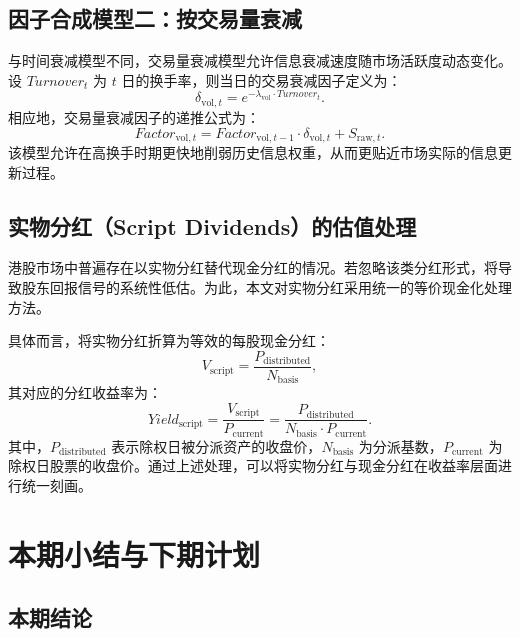 \documentclass[a4paper,10pt]{article}
\begin{document}
\subsection{因子合成模型二：按交易量衰减}

与时间衰减模型不同，交易量衰减模型允许信息衰减速度随市场活跃度动态变化。设 $Turnover_t$ 为 $t$ 日的换手率，则当日的交易衰减因子定义为：
\begin{equation}
\delta_{\text{vol},t} = e^{-\lambda_{\text{vol}} \cdot Turnover_t}.
\end{equation}
相应地，交易量衰减因子的递推公式为：
\begin{equation}
Factor_{\text{vol},t}
=
Factor_{\text{vol},t-1} \cdot \delta_{\text{vol},t}
+
S_{\text{raw},t}.
\end{equation}
该模型允许在高换手时期更快地削弱历史信息权重，从而更贴近市场实际的信息更新过程。

\subsection{实物分红（Script Dividends）的估值处理}

港股市场中普遍存在以实物分红替代现金分红的情况。若忽略该类分红形式，将导致股东回报信号的系统性低估。为此，本文对实物分红采用统一的等价现金化处理方法。

具体而言，将实物分红折算为等效的每股现金分红：
\begin{equation}
V_{\text{script}} = \frac{P_{\text{distributed}}}{N_{\text{basis}}},
\end{equation}
其对应的分红收益率为：
\begin{equation}
Yield_{\text{script}}
=
\frac{V_{\text{script}}}{P_{\text{current}}}
=
\frac{P_{\text{distributed}}}{N_{\text{basis}} \cdot P_{\text{current}}}.
\end{equation}
其中，$P_{\text{distributed}}$ 表示除权日被分派资产的收盘价，$N_{\text{basis}}$ 为分派基数，$P_{\text{current}}$ 为除权日股票的收盘价。通过上述处理，可以将实物分红与现金分红在收益率层面进行统一刻画。




\section{本期小结与下期计划}

\subsection{本期结论}
\end{document}

